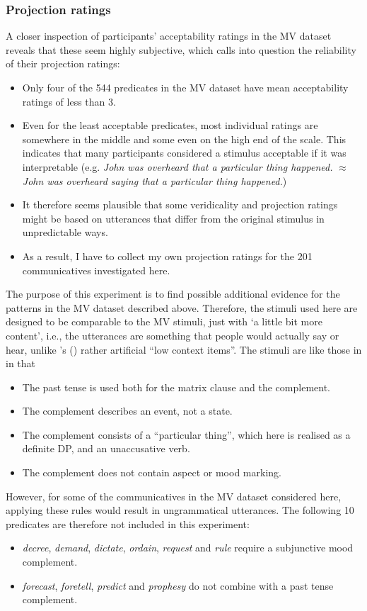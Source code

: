 \documentclass[11pt,fleqn]{article}
\newcommand{\6}{\mbox{$[\hspace*{-.6mm}[$}}
\newcommand{\9}{\mbox{$]\hspace*{-.6mm}]$}}
\newcommand{\citepos}[1]{\citeauthor{#1}'s (\citeyear{#1})}
\begin{document}
\subsubsection{Projection ratings}
A closer inspection of participants’ acceptability ratings in the MV dataset reveals that these seem highly subjective, which calls into question the reliability of their projection ratings:
\begin{itemize}
	\item Only four of the 544 predicates in the MV dataset have mean acceptability ratings of less than 3. 
	\item Even for the least acceptable predicates, most individual ratings are somewhere in the middle and some even on the high end of the scale. This indicates that many participants considered a stimulus acceptable if it was interpretable (e.g. \emph{John was overheard that a particular thing happened.} $\approx$ \emph{John was overheard saying that a particular thing happened.}) 
	\item It therefore seems plausible that some veridicality and projection ratings might be based on utterances that differ from the original stimulus in unpredictable ways. 
	\item As a result, I have to collect my own projection ratings for the 201 communicatives investigated here.
\end{itemize}

The purpose of this experiment is to find possible additional evidence for the patterns in the MV dataset described above. Therefore, the stimuli used here are designed to be comparable to the MV stimuli, just with ‘a little bit more content’, i.e., the utterances are something that people would actually say or hear, unlike \citepos{white-rawlins-nels2018} rather artificial ``low context items”. The stimuli are like those in \cite{white-rawlins-nels2018} in that 
\begin{itemize}
	\item The past tense is used both for the matrix clause and the complement.
	\item The complement describes an event, not a state.
	\item The complement consists of a ``particular thing”, which here is realised as a definite DP, and an unaccusative verb.
	\item The complement does not contain aspect or mood marking.
\end{itemize}

However, for some of the communicatives in the MV dataset considered here, applying these rules would result in ungrammatical utterances. The following 10 predicates are therefore not included in this experiment:
\begin{itemize}
	\item \emph{decree}, \emph{demand}, \emph{dictate}, \emph{ordain}, \emph{request} and \emph{rule} require a subjunctive mood complement.
	\item \emph{forecast}, \emph{foretell}, \emph{predict} and \emph{prophesy} do not combine with a past tense complement.
\end{itemize}
\end{document}
